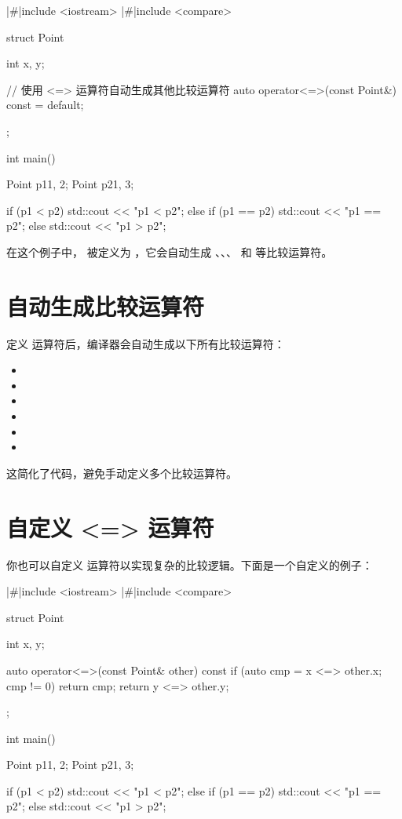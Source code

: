 \begin{cpplst}
|\#|include <iostream>
|\#|include <compare>

struct Point {
    int x, y;

    // 使用 <=> 运算符自动生成其他比较运算符
    auto operator<=>(const Point&) const = default;
};

int main() {
    Point p1{1, 2};
    Point p2{1, 3};

    if (p1 < p2)
        std::cout << "p1 < p2\n";
    else if (p1 == p2)
        std::cout << "p1 == p2\n";
    else
        std::cout << "p1 > p2\n";
}
\end{cpplst}

在这个例子中， 被定义为 ，它会自动生成 、、、 和  等比较运算符。

\section{自动生成比较运算符}
定义 \cppinline{<=>} 运算符后，编译器会自动生成以下所有比较运算符：

\begin{itemize}
	\item {}
	\item {}
	\item {}
	\item {}
	\item {}
	\item {}
\end{itemize}

这简化了代码，避免手动定义多个比较运算符。

\section{自定义 <=> 运算符}
你也可以自定义 \cppinline{<=>} 运算符以实现复杂的比较逻辑。下面是一个自定义的例子：

\begin{cpplst}
|\#|include <iostream>
|\#|include <compare>

struct Point {
    int x, y;

    auto operator<=>(const Point& other) const {
        if (auto cmp = x <=> other.x; cmp != 0)
            return cmp;
        return y <=> other.y;
    }
};

int main() {
    Point p1{1, 2};
    Point p2{1, 3};

    if (p1 < p2)
        std::cout << "p1 < p2\n";
    else if (p1 == p2)
        std::cout << "p1 == p2\n";
    else
        std::cout << "p1 > p2\n";
}
\end{cpplst}

